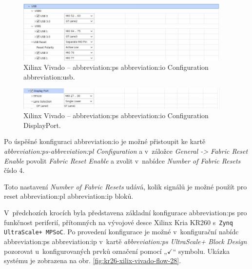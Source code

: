 \documentclass[a4paper, twoside, 11pt]{article}
\newcommand{\fbar}{\FloatBarrier}
\begin{document}
				\begin{figure}[htbp!]
					\centering
					\includegraphics[width=0.95\textwidth]{src/png/kr26-xilinx-vivado-flow/kr26-xilix-vivado-flow-25.jpg}
					\caption{Xilinx Vivado – \gls{abbreviation:ps} \gls{abbreviation:io} Configuration \gls{abbreviation:usb}.}
					\label{fig:kr26-xilix-vivado-flow-25}
				\end{figure}

				\begin{figure}[htbp!]
					\centering
					\includegraphics[width=0.95\textwidth]{src/png/kr26-xilinx-vivado-flow/kr26-xilix-vivado-flow-26.jpg}
					\caption{Xilinx Vivado – \gls{abbreviation:ps} \gls{abbreviation:io} Configuration DisplayPort.}
					\label{fig:kr26-xilix-vivado-flow-26}
				\end{figure}

				\fbar
				Po úspěšné konfiguraci \gls{abbreviation:io} je možné přistoupit ke kartě \textit{\gls{abbreviation:ps}-\gls{abbreviation:pl} Configuration} a v~záložce \textit{General -> Fabric Reset Enable} povolit \textit{Fabric Reset Enable} a zvolit v~nabídce \textit{Number of Fabric Resets} číslo 4.\par
				Toto nastavení \textit{Number of Fabric Resets} udává, kolik signálů je možné použít pro reset \gls{abbreviation:pl} \gls{abbreviation:ip} bloků. \cite{xilinx-ultra-scale-plus-mpsoc-processing-syste-product-guide} \cite{xilinx-wiki-atlassian-zynq-ultra-scale-plus-mpsoc-restart-solution}\par

				V~předchozích krocích byla představena základní konfigurace \gls{abbreviation:ps} pro funkčnost periferií, přítomných na vývojové desce Xilinx Kria KR260 s~\texttt{Zynq UltraScale+ MPSoC}. Po provedení konfigurace je možné v~konfigurační nabídc \gls{abbreviation:ps} \gls{abbreviation:ip} v~kartě \textit{\gls{abbreviation:ps} UltraScale+ Block Design} pozorovat u~konfigurovaných prvků označení pomocí „$\checkmark$“ symbolu. Ukázka systému je zobrazena na obr. \ref{fig:kr26-xilix-vivado-flow-28}.
\end{document}
